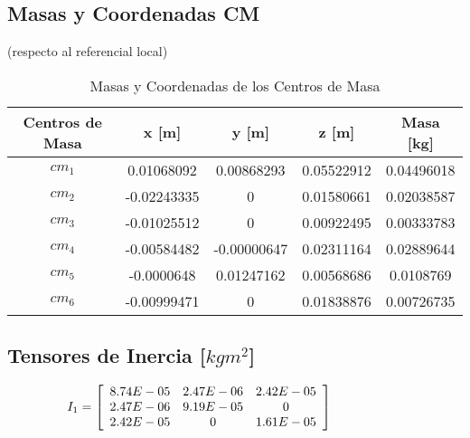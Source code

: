 \subsection{Masas y Coordenadas CM}

\begin{table}[H]%
\centering
    \begin{center}
    \caption{Masas y Coordenadas de los Centros de Masa} 
    (respecto al referencial local)
    \centering
    \bigskip
 
        \begin{tabular}{cccc||c}
        {Centros de Masa}& x [m] & y [m] & z [m] & Masa [kg]\\
        \hline
        $cm_1$ & 0.01068092    & 0.00868293   & 0.05522912 & 0.04496018 \\
        $cm_2$ & -0.02243335   & 0            & 0.01580661 & 0.02038587 \\
        $cm_3$ & -0.01025512   & 0            & 0.00922495 & 0.00333783 \\ 
        $cm_4$ & -0.00584482   & -0.00000647  & 0.02311164 & 0.02889644 \\
        $cm_5$ & -0.0000648    & 0.01247162   & 0.00568686 & 0.0108769  \\
        $cm_6$ & -0.00999471   & 0            & 0.01838876 & 0.00726735 \\
        \hline 

        \end{tabular}
    \end{center}
    \label{ref:TablaCentrosMasa}
\end{table}

\subsection{Tensores de Inercia [$kgm^2$]}

\begin{equation*}
    \hspace{-10mm}
    I_1 = \left[
        \begin{array}{ccc}
        8.74E-05&2.47E-06&2.42E-05\\
        2.47E-06&9.19E-05&0\\     
        2.42E-05&0&1.61E-05\\
        \end{array}\right]\hspace{10mm}
\end{equation*}

